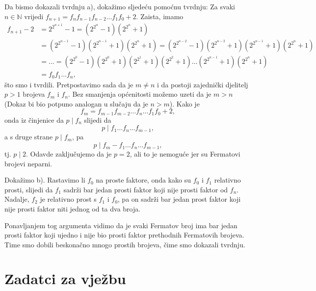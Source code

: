 \documentclass{book}
\renewenvironment{proof}{%
    \vspace{-\parskip}\begin{oldproof}%
    }{%
    \end{oldproof}%
}
\theoremstyle{definition}
\theoremstyle{definition}
\theoremstyle{remark}
\begin{document}
\begin{proof}[Rješenje]
Da bismo dokazali tvrdnju a), dokažimo sljedeću pomoćnu tvrdnju: Za svaki $n\in \mathbb{N}$ vrijedi $f_{n+1}=f_nf_{n-1}f_{n-2}\dots f_1f_0+2$. Zaista, imamo
\begin{align*}
f_{n+1}-2&=2^{2^{n+1}}-1=(2^{2^n}-1)(2^{2^n}+1)\\
&=(2^{2^{n-1}}-1)(2^{2^{n-1}}+1)(2^{2^n}+1)=(2^{2^{n-2}}-1)(2^{2^{n-2}}+1)(2^{2^{n-1}}+1)(2^{2^n}+1)\\
&=...=(2^{2^0}-1)(2^{2^0}+1)(2^{2^1}+1)(2^{2^2}+1)\dots(2^{2^{n-1}}+1)(2^{2^n}+1)\\
&=f_0f_1\dots f_n,
\end{align*}
što smo i tvrdili. Pretpostavimo sada da je $m\neq n$ i da postoji zajednički djelitelj $p>1$ brojeva $f_m$ i $f_n$. Bez smanjenja općenitosti možemo uzeti da je $m>n$ (Dokaz bi bio potpuno analogan u slučaju da je $n>m$). Kako je $$f_m=f_{m-1}f_{m-2}\dots f_{n}\dots f_1f_0+2,$$ onda iz činjenice da $p\; |\; f_n$ slijedi da $$p\; |\; f_1\dots f_n\dots f_{m-1},$$ a s druge strane $p\; |\; f_m$, pa $$p \; |\; f_m-f_1\dots f_n\dots f_{m-1},$$ tj. $p\; |\; 2$. Odavde zaključujemo da je $p=2$, ali to je nemoguće jer su Fermatovi brojevi neparni.

Dokažimo b). Rastavimo li $f_0$ na proste faktore, onda kako su $f_{0}$ i $f_{1}$ relativno prosti, slijedi da $f_{1}$ sadrži bar jedan prosti faktor koji nije prosti faktor od $f_{n}$. Nadalje, $f_{2}$ je relativno prost s $f_{1}$ i $f_{0}$, pa on sadrži bar jedan prost faktor koji nije prosti faktor niti jednog od ta dva broja. 

Ponavljanjem tog argumenta vidimo da je svaki Fermatov broj ima bar jedan prosti faktor koji ujedno i nije bio prosti faktor prethodnih Fermatovih brojeva. Time smo dobili beskonačno mnogo prostih brojeva, čime smo dokazali tvrdnju.
\end{proof}
\newpage
\section*{Zadatci za vježbu}
\end{document}
